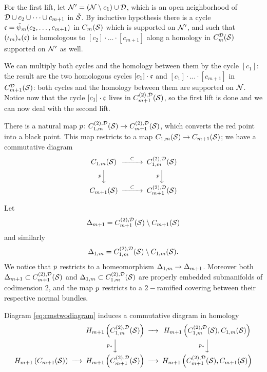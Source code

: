 For the first lift, let $\N'=\pa{\N\setminus c_1}\cup\D$, which is an open
neighborhood of $\D\cup c_2\cup\dots\cup c_{m+1}$ in $\mrS$. By inductive hypothesis
there is a cycle $\fc=\tpsi_m(c_2,\dots,c_{m+1})$ in $\cms$ which is supported on $\N'$,
and such that $(\iota_m)_*(\fc)$ is homologous to $[c_2]\cdot\ldots\cdot[c_{m+1}]$
along a homology in $\cmsD$ supported on $\N'$ as well.

We can multiply both
cycles and the homology between them by the cycle $[c_1]$: the result are the two homologous cycles
$[c_1]\cdot \fc$ and $[c_1]\cdot\ldots\cdot[c_{m+1}]$ in $C_{m+1}^{\D}(\S)$: both cycles and the
homology between them are supported on $\N$. Notice now that the
cycle $[c_1]\cdot\fc$ lives in $\cmstwoD$, so the first lift is done and we can now
deal with the second lift.

There is a natural map $\p\colon \fmstwoD\to \cmstwoD$, which converts the red point
into a black point. This map restricts to %
a map $C_{1,m}(\S)\to C_{m+1}(\S)$;
we have a commutative diagram
 \begin{equation}\label{eq:cmstwodiagram}
  \begin{CD}
   C_{1,m}(\S) @>\subset >> \fmstwoD %
\\   @V\p VV @V\p VV %
\\   C_{m+1}(\S) @>\subset >> \cmstwoD %
   \end{CD}
\end{equation}

\begin{defn}
\label{defn:falsediagonals} 
Let 
\[
\Dmone=\cmstwoD\setminus C_{m+1}(\S)
\]
and similarly
\[
\Donem=\fmstwoD\setminus C_{1,m}(\S).
\]
We notice that $\p$ restricts to a homeomorphism $\Donem\to\Dmone$. Moreover both $\Dmone\subset\cmstwoD$
and $\Donem\subset\fmstwoD$ are properly embedded submanifolds of codimension $2$, and the map $\p$ restricts to
a $2-$ramified covering between their respective normal bundles.
\end{defn}

Diagram \ref{eq:cmstwodiagram} induces a commutative diagram in homology
\begin{equation}
 \label{eq:fivediagram}
\minCDarrowwidth15pt
 \begin{CD}
  @. H_{m+1}\pa{\fmstwoD} @>>> H_{m+1}\pa{\fmstwoD, C_{1,m}(\S)}\\
  @. @V\p_*VV @V\p_*VV\\
  H_{m+1}\pa{ C_{m+1}(\S)} @>>> H_{m+1}\pa{\cmstwoD} @>>> H_{m+1}\pa{\cmstwoD,C_{m+1}(\S)}
 \end{CD}
\end{equation}

